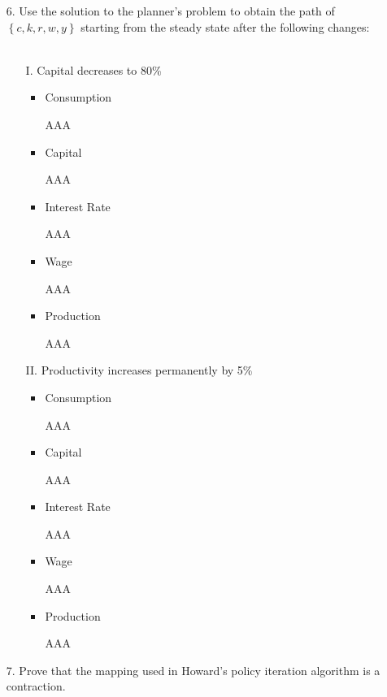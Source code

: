 \documentclass[a4paper]{article}
\begin{document}
\begin{enumerate}
\item[6.] Use the solution to the planner’s problem to obtain the path of $\left\lbrace c, k, r, w, y \right\rbrace$ starting from the steady state after the following changes: \\~\

\begin{enumerate}
\item[I.] Capital decreases to 80\%
\begin{itemize}
\item Consumption
\begin{center}
AAA
\end{center}
\clearpage
\item Capital
\begin{center}
AAA
\end{center}
\item Interest Rate
\begin{center}
AAA
\end{center}
\item Wage
\begin{center}
AAA
\end{center}
\clearpage
\item Production
\begin{center}
AAA
\end{center}

\end{itemize}

\item[II.] Productivity increases permanently by 5\%
\begin{itemize}
\item Consumption
\begin{center}
AAA
\end{center}
\item Capital
\begin{center}
AAA
\end{center}
\clearpage
\item Interest Rate
\begin{center}
AAA
\end{center}
\item Wage
\begin{center}
AAA
\end{center}
\item Production
\begin{center}
AAA
\end{center}

\end{itemize}
\end{enumerate}

\item[7.] Prove that the mapping used in Howard's policy iteration algorithm is a contraction.



\end{enumerate}







%
%
\end{document}
